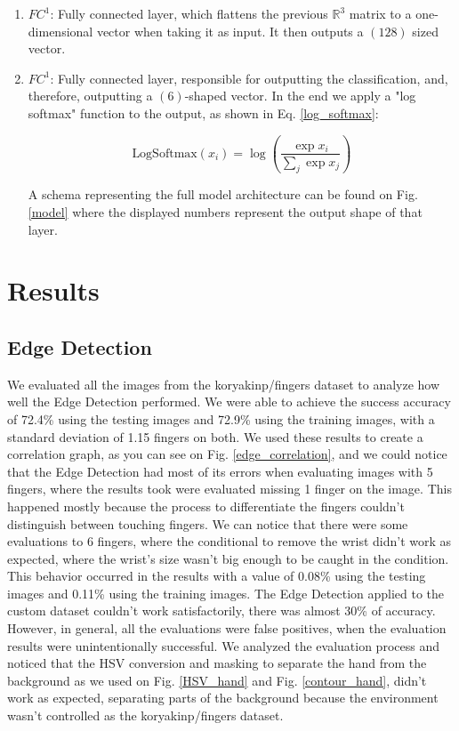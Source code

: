 \documentclass[conference]{IEEEtran}
\begin{document}
\begin{enumerate}
    \item $FC^1$: Fully connected layer, which flattens the previous $\mathbb{R}^3$ matrix to a one-dimensional vector when taking it as input. It then outputs a $(128)$ sized vector.
    \item $FC^1$: Fully connected layer, responsible for outputting the classification, and, therefore, outputting a $(6)$-shaped vector. In the end we apply a "log softmax" function to the output, as shown in Eq. \ref{log_softmax}:
    
    \begin{equation*}
        \text{LogSoftmax}(x_i) = \log \left( \frac{\exp{x_i}}{\sum_j \exp{x_j}}  \right)
        \label{log_softmax}
    \end{equation*}
    
A schema representing the full model architecture can be found on Fig. \ref{model} where the displayed numbers represent the output shape of that layer.
    
\end{enumerate}

\section{Results}
\subsection{Edge Detection}
We evaluated all the images from the koryakinp/fingers dataset to analyze how well the Edge Detection performed. We were able to achieve the success accuracy of 72.4\% using the testing images and 72.9\% using the training images, with a standard deviation of 1.15 fingers on both. 
We used these results to create a correlation graph, as you can see on Fig. \ref{edge_correlation}, and we could notice that the Edge Detection had most of its errors when evaluating images with 5 fingers, where the results took were evaluated missing 1 finger on the image. This happened mostly because the process to differentiate the fingers couldn't distinguish between touching fingers. 
We can notice that there were some evaluations to 6 fingers, where the conditional to remove the wrist didn't work as expected, where the wrist's size wasn't big enough to be caught in the condition. This behavior occurred in the results with a value of 0.08\% using the testing images and 0.11\% using the training images.
The Edge Detection applied to the custom dataset couldn't work satisfactorily, there was almost 30\% of accuracy. However, in general, all the evaluations were false positives, when the evaluation results were unintentionally successful. We analyzed the evaluation process and noticed that the HSV conversion and masking to separate the hand from the background as we used on Fig. \ref{HSV_hand} and Fig. \ref{contour_hand}, didn't work as expected, separating parts of the background because the environment wasn't controlled as the koryakinp/fingers dataset.
\end{document}
